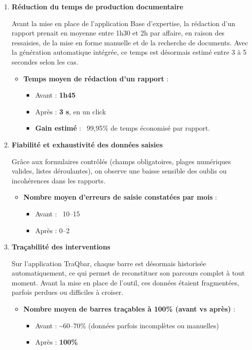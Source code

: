\documentclass[11pt,a4paper]{article}
\begin{document}
\begin{enumerate}

\item \textbf{Réduction du temps de production documentaire}

Avant la mise en place de l’application Base d’expertise, la rédaction d’un rapport prenait en moyenne entre 1h30 et 2h par affaire, en raison des ressaisies, de la mise en forme manuelle et de la recherche de documents. Avec la génération automatique intégrée, ce temps est désormais estimé entre 3 à 5 secondes selon les cas.

\begin{itemize}
    \item \textbf{Temps moyen de rédaction d’un rapport} :
    \begin{itemize}
        \item Avant : \textbf{1h45}
        \item Après : \textbf{3 s}, en un click
        \item \textbf{Gain estimé} : ~99,95\% de temps économisé par rapport.
    \end{itemize}
\end{itemize}

\item \textbf{Fiabilité et exhaustivité des données saisies}

Grâce aux formulaires contrôlés (champs obligatoires, plages numériques valides, listes déroulantes), on observe une baisse sensible des oublis ou incohérences dans les rapports.

\begin{itemize}
    \item \textbf{Nombre moyen d’erreurs de saisie constatées par mois} :
    \begin{itemize}
        \item Avant : ~10–15
        \item Après : 0–2
    \end{itemize}
\end{itemize}

\item \textbf{Traçabilité des interventions}

Sur l’application TraQbar, chaque barre est désormais historisée automatiquement, ce qui permet de reconstituer son parcours complet à tout moment. Avant la mise en place de l’outil, ces données étaient fragmentées, parfois perdues ou difficiles à croiser.

\begin{itemize}
    \item \textbf{Nombre moyen de barres traçables à 100\% (avant vs après)} :
    \begin{itemize}
        \item Avant : \textasciitilde 60–70\% (données parfois incomplètes ou manuelles)
        \item Après : \textbf{100\%}
    \end{itemize}
\end{itemize}


\end{enumerate}
\end{document}

